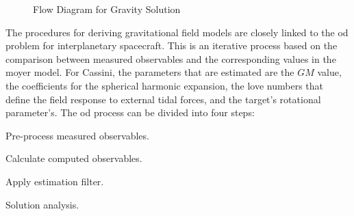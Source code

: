 \documentclass{article}
\begin{document}
\begin{figure}[H]
                    	\caption{Flow Diagram for Gravity Solution}
                    	\label{fig:usr_flow_diagram_gravity}
                    \end{figure}
                    The procedures for deriving
                    \gls{gravitational field} models are closely
                    linked to the \gls{od} problem for
                    interplanetary spacecraft. This is an iterative
                    process based on the comparison between measured
                    observables and the corresponding values in the
                    \gls{moyer model}. For Cassini, the parameters
                    that are estimated are the $GM$ value, the
                    coefficients for the \gls{spherical harmonic}
                    expansion, the \gls{love numbers} that define
                    the field response to external tidal forces,
                    and the target's rotational parameter's.
                    The \gls{od} process can be divided
                    into four steps:
                    \begin{enumerate}
                        \begin{multicols}{2}
                            \item Pre-process measured observables.
                            \item Calculate computed observables.
                            \item Apply estimation filter.
                            \item Solution analysis.
                        \end{multicols}
                    \end{enumerate}
\end{document}
